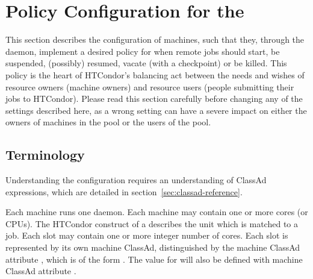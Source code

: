 \section{\label{sec:Configuring-Policy}Policy Configuration for the }

This section describes the configuration of machines,
such that they,
through the  daemon,
implement a desired policy for when remote jobs should start, be
suspended, (possibly) resumed, vacate (with a checkpoint) or be killed.
This policy is the heart of HTCondor's balancing act
between the needs and wishes of resource owners (machine owners) and
resource users (people submitting their jobs to HTCondor).
Please read
this section carefully before changing any of the settings
described here, as a wrong setting can have a severe impact on
either the owners of machines in the pool or the users of the pool.

\subsection{\label{sec:Startd-Terminology}Terminology}

Understanding the configuration requires an understanding of
ClassAd expressions,
which are detailed in section~\ref{sec:classad-reference}.

Each machine runs one  daemon.
Each machine may contain one or more cores (or CPUs).
The HTCondor construct of a  describes the unit which
is matched to a job.
Each slot may contain one or more integer number of cores.
Each slot is represented by its own machine ClassAd,
distinguished by the machine ClassAd attribute ,
which is of the form .
The value for  will also be defined with 
machine ClassAd attribute .


